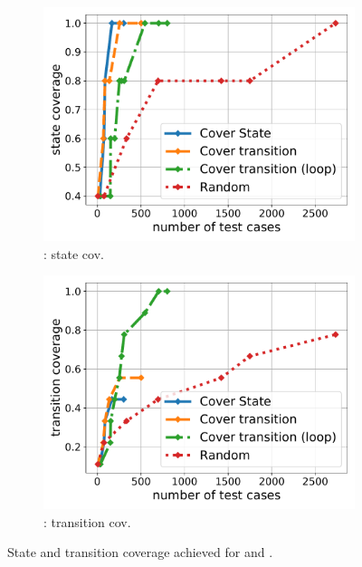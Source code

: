 \begin{figure}[t]
\begin{subfigure}[b]{0.47\columnwidth}
		\includegraphics[width=\columnwidth]{Figures/Chapter3/BlindAuction-state-coverage.pdf}
		\caption{: state cov.}
		\label{fig:auction-state}
	\end{subfigure}
	\begin{subfigure}[b]{0.47\columnwidth}
		\includegraphics[width=\columnwidth]{Figures/Chapter3/BlindAuction-transition-coverage.pdf}
		\caption{: transition cov.}
		\label{fig:auction-transition}
	\end{subfigure}
	\caption{State and transition coverage achieved for \wecredit and
		.}\label{fig:coverage}
\end{figure}

